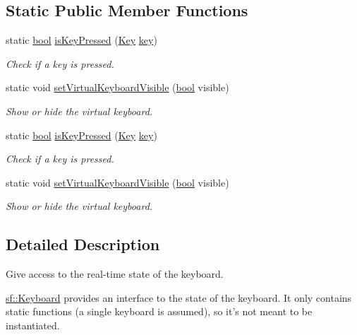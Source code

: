 \subsection*{Static Public Member Functions}
\begin{DoxyCompactItemize}
\item 
static \hyperlink{term__entry_8h_a002004ba5d663f149f6c38064926abac}{bool} \hyperlink{classsf_1_1_keyboard_a80a04b2f53005886957f49eee3531599}{is\-Key\-Pressed} (\hyperlink{classsf_1_1_keyboard_acb4cacd7cc5802dec45724cf3314a142}{Key} \hyperlink{unionkey}{key})
\begin{DoxyCompactList}\small\item\em Check if a key is pressed. \end{DoxyCompactList}\item 
static void \hyperlink{classsf_1_1_keyboard_ad61fee7e793242d444a8c5acd662fe5b}{set\-Virtual\-Keyboard\-Visible} (\hyperlink{term__entry_8h_a002004ba5d663f149f6c38064926abac}{bool} visible)
\begin{DoxyCompactList}\small\item\em Show or hide the virtual keyboard. \end{DoxyCompactList}\item 
static \hyperlink{term__entry_8h_a002004ba5d663f149f6c38064926abac}{bool} \hyperlink{classsf_1_1_keyboard_a80a04b2f53005886957f49eee3531599}{is\-Key\-Pressed} (\hyperlink{classsf_1_1_keyboard_acb4cacd7cc5802dec45724cf3314a142}{Key} \hyperlink{unionkey}{key})
\begin{DoxyCompactList}\small\item\em Check if a key is pressed. \end{DoxyCompactList}\item 
static void \hyperlink{classsf_1_1_keyboard_ad61fee7e793242d444a8c5acd662fe5b}{set\-Virtual\-Keyboard\-Visible} (\hyperlink{term__entry_8h_a002004ba5d663f149f6c38064926abac}{bool} visible)
\begin{DoxyCompactList}\small\item\em Show or hide the virtual keyboard. \end{DoxyCompactList}\end{DoxyCompactItemize}


\subsection{Detailed Description}
Give access to the real-\/time state of the keyboard. 

\hyperlink{classsf_1_1_keyboard}{sf\-::\-Keyboard} provides an interface to the state of the keyboard. It only contains static functions (a single keyboard is assumed), so it's not meant to be instantiated.

